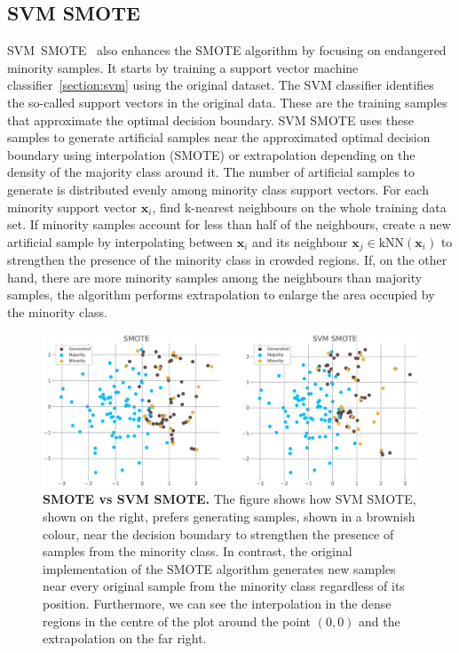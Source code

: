 \subsection{SVM SMOTE}
\label{subsection:svm-smote}

SVM~SMOTE~\cite{svm-smote} also enhances the SMOTE algorithm by focusing on endangered minority
samples. It starts by training a support vector machine classifier~\ref{section:svm} using the
original dataset. The SVM classifier identifies the so-called support vectors in the original data.
These are the training samples that approximate the optimal decision boundary. SVM SMOTE uses these
samples to generate artificial samples near the approximated optimal decision boundary using
interpolation (SMOTE) or extrapolation depending on the density of the majority class around it.
The number of artificial samples to generate is distributed evenly among minority class support
vectors. For each minority support vector $\mathbf{x}_i$, find k-nearest neighbours on the whole
training data set. If minority samples account for less than half of the neighbours, create a new
artificial sample by interpolating between $\mathbf{x}_i$ and its neighbour $\mathbf{x}_j \in
\mathrm{kNN}(\mathbf{x}_i)$ to strengthen the presence of the minority class in crowded regions.
If, on the other hand, there are more minority samples among the neighbours than majority samples,
the algorithm performs extrapolation to enlarge the area occupied by the minority class.

\begin{figure}
    \centering
    \includegraphics[width=\linewidth]{figures/smote_vs_svmsmote.eps}
    \caption{
        \textbf{SMOTE vs SVM SMOTE.} The figure shows how SVM SMOTE, shown on the right, prefers
        generating samples, shown in a brownish colour, near the decision boundary to strengthen
        the presence of samples from the minority class. In contrast, the original implementation
        of the SMOTE algorithm generates new samples near every original sample from the minority
        class regardless of its position. Furthermore, we can see the interpolation in the dense
        regions in the centre of the plot around the point $(0, 0)$ and the extrapolation on the
        far right.
    }
    \label{figure:smote-vs-svmsmote}
\end{figure}



